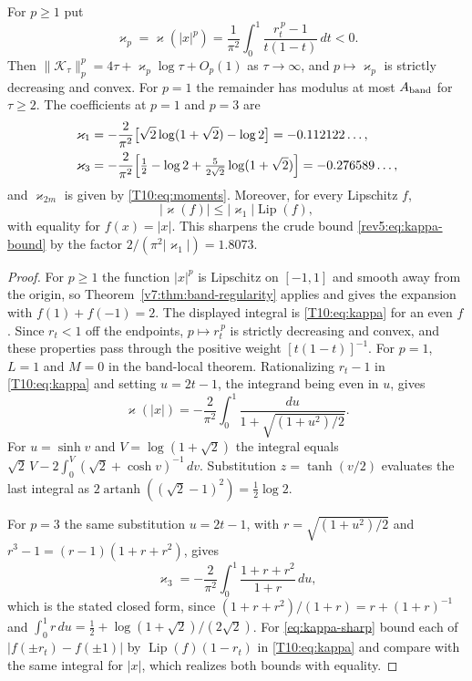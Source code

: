 \begin{corollary}\label{cor:schatten}\label{v7:cor:trace-norm}
For $p\ge1$ put
\[
 \varkappa_p=\varkappa(|x|^p)
 =\frac1{\pi^2}\int_0^1\frac{r_t^{\,p}-1}{t(1-t)}\,dt<0 .
\]
Then $\|\mathcal K_\tau\|_p^p=4\tau+\varkappa_p\log\tau+O_p(1)$ as
$\tau\to\infty$, and $p\mapsto\varkappa_p$ is strictly decreasing and convex.
For $p=1$ the remainder has modulus at most $A_{\rm band}$ for $\tau\ge2$.
The coefficients at $p=1$ and $p=3$ are
\begin{align*}
 \varkappa_1&=-\frac2{\pi^2}\bigl[\sqrt2\log(1+\sqrt2)-\log2\bigr]
   =-0.112122\ldots,\\
 \varkappa_3&=-\frac2{\pi^2}\Bigl[\tfrac12-\log2
      +\tfrac5{2\sqrt2}\log(1+\sqrt2)\Bigr]=-0.276589\ldots,
\end{align*}
and $\varkappa_{2m}$ is given by \eqref{T10:eq:moments}.  Moreover, for every
Lipschitz $f$,
\begin{equation}\label{eq:kappa-sharp}
 |\varkappa(f)|\le|\varkappa_1|\operatorname{Lip}(f),
\end{equation}
with equality for $f(x)=|x|$.  This sharpens the crude bound
\eqref{rev5:eq:kappa-bound} by the factor $2/(\pi^2|\varkappa_1|)=1.8073$.
\end{corollary}
\begin{proof}
For $p\ge1$ the function $|x|^p$ is Lipschitz on $[-1,1]$ and smooth away from
the origin, so Theorem~\ref{v7:thm:band-regularity} applies and gives the
expansion with $f(1)+f(-1)=2$.  The displayed integral is
\eqref{T10:eq:kappa} for an even $f$.  Since $r_t<1$ off the endpoints,
$p\mapsto r_t^{\,p}$ is strictly decreasing and convex, and these properties
pass through the positive weight $[t(1-t)]^{-1}$.  For $p=1$, $L=1$ and $M=0$ in the band-local theorem.
Rationalizing $r_t-1$ in \eqref{T10:eq:kappa} and setting $u=2t-1$, the
integrand being even in $u$, gives
\[
 \varkappa(|x|)=-\frac2{\pi^2}
       \int_0^1\frac{du}{1+\sqrt{(1+u^2)/2}}.
\]
For $u=\sinh v$ and $V=\log(1+\sqrt2)$ the integral equals
$\sqrt2\,V-2\int_0^V(\sqrt2+\cosh v)^{-1}\,dv$.
Substitution $z=\tanh(v/2)$ evaluates the last integral as
$2\operatorname{artanh}((\sqrt2-1)^2)=\tfrac12\log2$.

For $p=3$ the same substitution
$u=2t-1$, with $r=\sqrt{(1+u^2)/2}$ and
$r^3-1=(r-1)(1+r+r^2)$, gives
\[
 \varkappa_3=-\frac2{\pi^2}\int_0^1\frac{1+r+r^2}{1+r}\,du,
\]
which is the stated closed form, since $(1+r+r^2)/(1+r)=r+(1+r)^{-1}$ and
$\int_0^1r\,du=\tfrac12+\log(1+\sqrt2)/(2\sqrt2)$.
For \eqref{eq:kappa-sharp} bound each of $|f(\pm r_t)-f(\pm1)|$ by
$\operatorname{Lip}(f)(1-r_t)$ in \eqref{T10:eq:kappa} and compare with the
same integral for $|x|$, which realizes both bounds with equality.
\end{proof}

